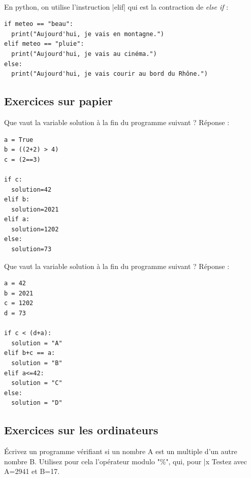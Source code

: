 \documentclass[11pt, a4paper]{book}
\begin{document}
\paragraph{}
En python, on utilise l'instruction |elif| qui est la contraction de \textit{else if} :

\begin{lstlisting}
if meteo == "beau":
  print("Aujourd'hui, je vais en montagne.")
elif meteo == "pluie":
  print("Aujourd'hui, je vais au cinéma.")
else:
  print("Aujourd'hui, je vais courir au bord du Rhône.")
\end{lstlisting}


\subsection{Exercices sur papier}

\begin{exercice}
Que vaut la variable solution à la fin du programme suivant ? %
Réponse : 

\end{exercice}
\begin{lstlisting}
a = True
b = ((2+2) > 4)
c = (2==3)

if c:
  solution=42
elif b:
  solution=2021
elif a:
  solution=1202
else:
  solution=73
\end{lstlisting}

\begin{exercice}
Que vaut la variable solution à la fin du programme suivant ?  %
Réponse : 
\end{exercice}

\begin{lstlisting}
a = 42
b = 2021
c = 1202
d = 73

if c < (d+a):
  solution = "A"
elif b+c == a:
  solution = "B"
elif a<=42:
  solution = "C"
else:
  solution = "D"

\end{lstlisting}



\subsection{Exercices sur les ordinateurs}

\begin{exercice}
Écrivez un programme vérifiant si un nombre A est un multiple d'un autre nombre B. 
Utilisez pour cela l'opérateur modulo "\%", qui, pour |x%
Testez avec A=2941 et B=17.
\end{exercice}
\end{document}
